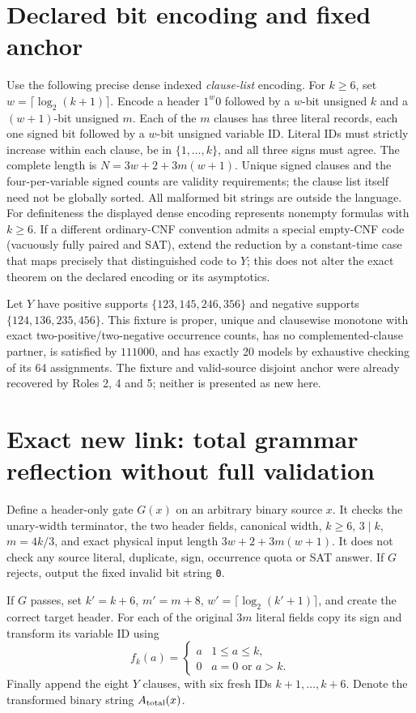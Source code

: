 \documentclass[11pt]{article}
\begin{document}
\section{Declared bit encoding and fixed anchor}
Use the following precise dense indexed \emph{clause-list} encoding. For $k\ge6$, set $w=\lceil\log_2(k+1)\rceil$. Encode a header $1^w0$ followed by a $w$-bit unsigned $k$ and a $(w+1)$-bit unsigned $m$. Each of the $m$ clauses has three literal records, each one signed bit followed by a $w$-bit unsigned variable ID. Literal IDs must strictly increase within each clause, be in $\{1,\ldots,k\}$, and all three signs must agree. The complete length is $N=3w+2+3m(w+1)$. Unique signed clauses and the four-per-variable signed counts are validity requirements; the clause list itself need not be globally sorted. All malformed bit strings are outside the language. For definiteness the displayed dense encoding represents nonempty formulas with $k\ge6$. If a different ordinary-CNF convention admits a special empty-CNF code (vacuously fully paired and SAT), extend the reduction by a constant-time case that maps precisely that distinguished code to $Y$; this does not alter the exact theorem on the declared encoding or its asymptotics.

Let $Y$ have positive supports $\{123,145,246,356\}$ and negative supports $\{124,136,235,456\}$. This fixture is proper, unique and clausewise monotone with exact two-positive/two-negative occurrence counts, has no complemented-clause partner, is satisfied by $111000$, and has exactly 20 models by exhaustive checking of its 64 assignments. The fixture and valid-source disjoint anchor were already recovered by Roles 2, 4 and 5; neither is presented as new here.

\section{Exact new link: total grammar reflection without full validation}
Define a header-only gate $G(x)$ on an arbitrary binary source $x$. It checks the unary-width terminator, the two header fields, canonical width, $k\ge6$, $3\mid k$, $m=4k/3$, and exact physical input length $3w+2+3m(w+1)$. It does not check any source literal, duplicate, sign, occurrence quota or SAT answer. If $G$ rejects, output the fixed invalid bit string \texttt{0}.

If $G$ passes, set $k'=k+6$, $m'=m+8$, $w'=\lceil\log_2(k'+1)\rceil$, and create the correct target header. For each of the original $3m$ literal fields copy its sign and transform its variable ID using
\[
f_k(a)=\begin{cases}a&1\le a\le k,\\0&a=0\text{ or }a>k.\end{cases}
\]
Finally append the eight $Y$ clauses, with six fresh IDs $k+1,\ldots,k+6$. Denote the transformed binary string $A_{\rm total}(x)$.
\end{document}
